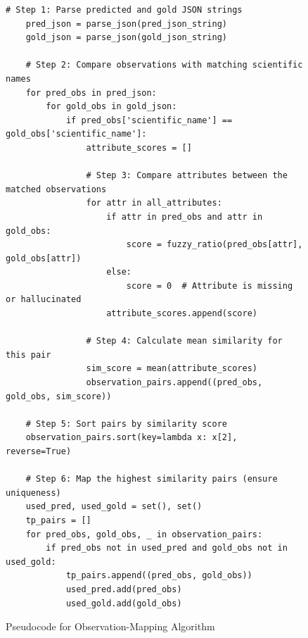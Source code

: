 

\begin{figure}[ht]
    \centering
    \begin{lstlisting}[style=pseudocode]
    # Step 1: Parse predicted and gold JSON strings
    pred_json = parse_json(pred_json_string)
    gold_json = parse_json(gold_json_string)
    
    # Step 2: Compare observations with matching scientific names
    for pred_obs in pred_json:
        for gold_obs in gold_json:
            if pred_obs['scientific_name'] == gold_obs['scientific_name']:
                attribute_scores = []
    
                # Step 3: Compare attributes between the matched observations
                for attr in all_attributes:
                    if attr in pred_obs and attr in gold_obs:
                        score = fuzzy_ratio(pred_obs[attr], gold_obs[attr])
                    else:
                        score = 0  # Attribute is missing or hallucinated
                    attribute_scores.append(score)
    
                # Step 4: Calculate mean similarity for this pair
                sim_score = mean(attribute_scores)
                observation_pairs.append((pred_obs, gold_obs, sim_score))
    
    # Step 5: Sort pairs by similarity score
    observation_pairs.sort(key=lambda x: x[2], reverse=True)
    
    # Step 6: Map the highest similarity pairs (ensure uniqueness)
    used_pred, used_gold = set(), set()
    tp_pairs = []
    for pred_obs, gold_obs, _ in observation_pairs:
        if pred_obs not in used_pred and gold_obs not in used_gold:
            tp_pairs.append((pred_obs, gold_obs))
            used_pred.add(pred_obs)
            used_gold.add(gold_obs)
    \end{lstlisting}
    \caption{Pseudocode for Observation-Mapping Algorithm}
    \label{fig:mapping_pseudocode}
\end{figure}
